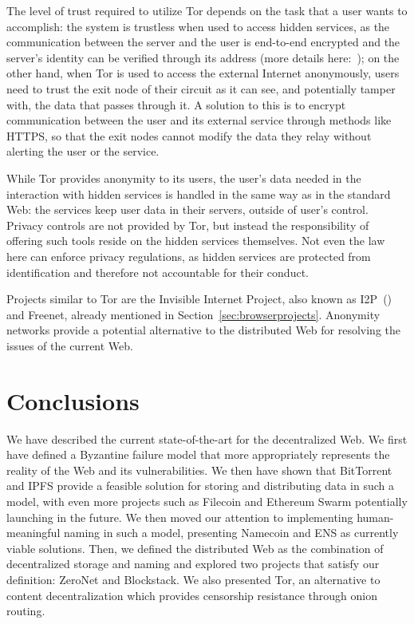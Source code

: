 \documentclass[mscthesis]{usiinfthesis}
\begin{document}
The level of trust required to utilize Tor depends on the task that a user wants to accomplish: the system is trustless when used to access hidden services, as the communication between the server and the user is end-to-end encrypted and the server's identity can be verified through its address (more details here:~\cite{website:torhiddenservice}); on the other hand, when Tor is used to access the external Internet anonymously, users need to trust the exit node of their circuit as it can see, and potentially tamper with, the data that passes through it. A solution to this is to encrypt communication between the user and its external service through methods like HTTPS, so that the exit nodes cannot modify the data they relay without alerting the user or the service.

While Tor provides anonymity to its users, the user's data needed in the interaction with hidden services is handled in the same way as in the standard Web: the services keep user data in their servers, outside of user's control. Privacy controls are not provided by Tor, but instead the responsibility of offering such tools reside on the hidden services themselves. Not even the law here can enforce privacy regulations, as hidden services are protected from identification and therefore not accountable for their conduct.

Projects similar to Tor are the Invisible Internet Project, also known as I2P~(\cite{i2p}) and Freenet, already mentioned in Section~\ref{sec:browserprojects}. Anonymity networks provide a potential alternative to the distributed Web for resolving the issues of the current Web. %

\chapter{Conclusions}\label{ch:conclusions}

We have described the current state-of-the-art for the decentralized Web. We first have defined a Byzantine failure model that more appropriately represents the reality of the Web and its vulnerabilities. We then have shown that BitTorrent and IPFS provide a feasible solution for storing and distributing data in such a model, with even more projects such as Filecoin and Ethereum Swarm potentially launching in the future. We then moved our attention to implementing human-meaningful naming in such a model, presenting Namecoin and ENS as currently viable solutions. Then, we defined the distributed Web as the combination of decentralized storage and naming and explored two projects that satisfy our definition: ZeroNet and Blockstack. We also presented Tor, an alternative to content decentralization which provides censorship resistance through onion routing.
\end{document}
